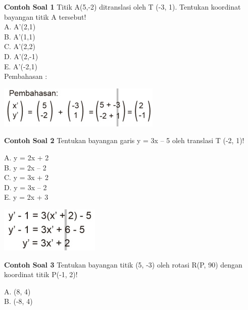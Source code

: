 \documentclass[11pt,fleqn]{book} %
\begin{document}
\textbf{Contoh Soal 1}
\noindent Titik A(5,-2) ditranslasi oleh  T (-3, 1). Tentukan koordinat bayangan titik A tersebut!\\

A. A’(2,1)\\

B. A’(1,1)\\

C. A’(2,2)\\

D. A’(2,-1)\\

E. A’(-2,1)\\

Pembahasan :

\noindent
\begin{center}
\includegraphics{Pictures/28.jpg}\\
\end{center}

\textbf{Contoh Soal 2}
\noindent Tentukan bayangan garis y = 3x – 5 oleh translasi T (-2, 1)!

A. y = 2x + 2\\

B. y = 2x – 2\\

C. y = 3x + 2\\

D. y = 3x – 2\\

E. y = 2x + 3\\

\noindent
\begin{center}
\includegraphics{Pictures/29.jpg}\\
\end{center}

\textbf{Contoh Soal 3}
\noindent Tentukan bayangan titik (5, -3) oleh rotasi R(P, 90) dengan koordinat titik P(-1, 2)!

A. (8, 4)\\

B. (-8, 4)\\
\end{document}

